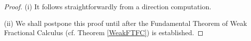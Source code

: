 \documentclass[leqno,final]{siamltex}
\numberwithin{equation}{section}
\renewcommand{\(}{\bigl(}
\renewcommand{\)}{\bigr)}
\begin{document}
    \begin{proof}
    (i) %
	It follows straightforwardly from a direction computation. 
	
	(ii) We shall postpone this proof until after the Fundamental Theorem of Weak Fractional Calculus (cf. Theorem \ref{WeakFTFC}) is established.
	

\end{proof}
\end{document}
